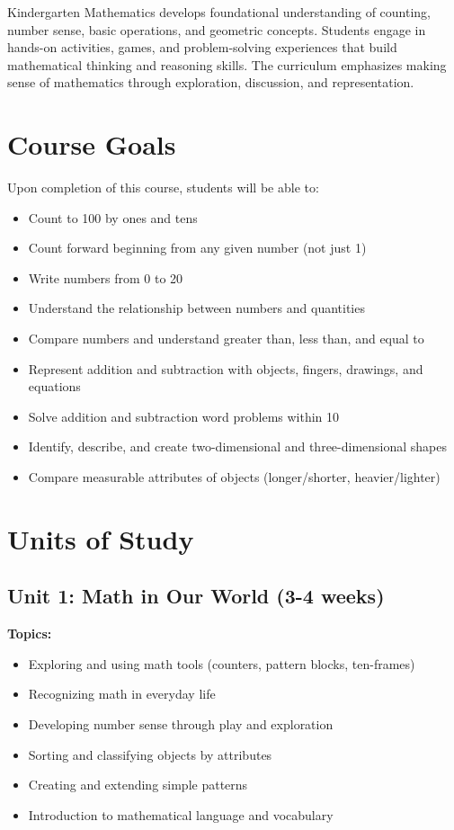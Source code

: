 \documentclass[11pt,letterpaper]{report}
\begin{document}
Kindergarten Mathematics develops foundational understanding of counting, number sense, basic operations, and geometric concepts. Students engage in hands-on activities, games, and problem-solving experiences that build mathematical thinking and reasoning skills. The curriculum emphasizes making sense of mathematics through exploration, discussion, and representation.

\section{Course Goals}

Upon completion of this course, students will be able to:

\begin{itemize}
    \item Count to 100 by ones and tens
    \item Count forward beginning from any given number (not just 1)
    \item Write numbers from 0 to 20
    \item Understand the relationship between numbers and quantities
    \item Compare numbers and understand greater than, less than, and equal to
    \item Represent addition and subtraction with objects, fingers, drawings, and equations
    \item Solve addition and subtraction word problems within 10
    \item Identify, describe, and create two-dimensional and three-dimensional shapes
    \item Compare measurable attributes of objects (longer/shorter, heavier/lighter)
\end{itemize}

\section{Units of Study}

\subsection{Unit 1: Math in Our World (3-4 weeks)}

\textbf{Topics:}
\begin{itemize}
    \item Exploring and using math tools (counters, pattern blocks, ten-frames)
    \item Recognizing math in everyday life
    \item Developing number sense through play and exploration
    \item Sorting and classifying objects by attributes
    \item Creating and extending simple patterns
    \item Introduction to mathematical language and vocabulary
\end{itemize}
\end{document}
